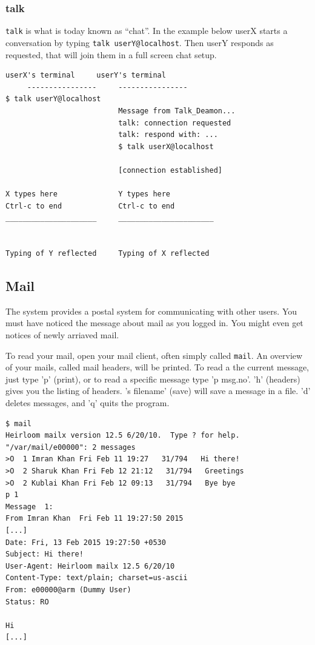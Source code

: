 \documentclass[11pt,a4paper,twoside]{article}
\begin{document}
\subsubsection{talk}

\texttt{talk} is what is today known as ``chat''. In the example below
userX starts a conversation by typing \texttt{talk userY@localhost}. Then
userY responds as requested, that will join them in a full screen chat setup.


\begin{lstlisting}[frame=single]
     userX's terminal     userY's terminal
     ----------------     ----------------
$ talk userY@localhost
                          Message from Talk_Deamon...
                          talk: connection requested
                          talk: respond with: ...
                          $ talk userX@localhost

                          [connection established]

X types here              Y types here
Ctrl-c to end             Ctrl-c to end
_____________________     ______________________


Typing of Y reflected     Typing of X reflected  
\end{lstlisting}


\subsection{Mail}

The system provides a postal system for communicating with other users.
You must have noticed the message about mail as you logged in. You might
even get notices of newly arriaved mail.

To read your mail, open your mail client, often simply called \texttt{mail}.
An overview of your mails, called mail headers, will be printed. To read a 
the current message, just type 'p' (print), or to read a specific message 
type 'p msg.no'. 'h' (headers) gives you the listing of headers. 's filename' 
(save) will save a message in a file. 'd' deletes messages, and 'q' quits 
the program.


\begin{lstlisting}[frame=single]
$ mail
Heirloom mailx version 12.5 6/20/10.  Type ? for help.
"/var/mail/e00000": 2 messages
>O  1 Imran Khan Fri Feb 11 19:27   31/794   Hi there!
>O  2 Sharuk Khan Fri Feb 12 21:12   31/794   Greetings 
>O  2 Kublai Khan Fri Feb 12 09:13   31/794   Bye bye
p 1
Message  1:
From Imran Khan  Fri Feb 11 19:27:50 2015
[...]
Date: Fri, 13 Feb 2015 19:27:50 +0530
Subject: Hi there!
User-Agent: Heirloom mailx 12.5 6/20/10
Content-Type: text/plain; charset=us-ascii
From: e00000@arm (Dummy User)
Status: RO

Hi
[...]
\end{lstlisting}
\end{document}

